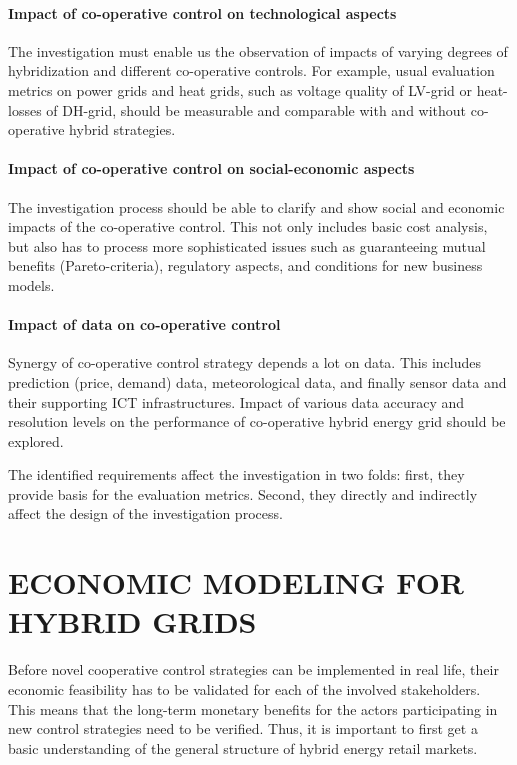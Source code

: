 \documentclass[review]{elsarticle}
\begin{document}
\paragraph{Impact of co-operative control on technological aspects}
The investigation must enable us the observation of impacts of
varying degrees of hybridization and different co-operative
controls. For example, usual evaluation metrics on power grids and
heat grids, such as voltage quality of LV-grid or heat-losses of
DH-grid, should be measurable and comparable with and without
co-operative hybrid strategies. 

\paragraph{Impact of co-operative control on social-economic aspects} 
The investigation process should be able to clarify and show social
and economic impacts of the co-operative control. This not only
includes basic cost analysis, but also has to process more
sophisticated issues such as guaranteeing mutual benefits
(Pareto-criteria), regulatory aspects, and conditions for new business
models. 

\paragraph{Impact of data on co-operative control}
Synergy of co-operative control strategy depends a lot on data. 
This includes prediction (price, demand) data, meteorological data,
and finally sensor data and their supporting ICT
infrastructures. Impact of various data accuracy and resolution levels 
on the performance of co-operative hybrid energy grid should be
explored. 

The identified requirements affect the investigation in two folds:
first, they provide basis for the evaluation metrics. Second, they
directly and indirectly affect the design of the investigation
process. 

     
\section{\uppercase{Economic Modeling for Hybrid Grids}}
\label{sec:econ} 
Before novel cooperative control strategies can be implemented in real
life, their economic feasibility has to be validated for each of the
involved stakeholders. This means that the long-term monetary benefits
for the actors participating in new control strategies need to be
verified. Thus, it is important to first get a basic
understanding of the general structure of hybrid energy retail
markets.
\end{document}
